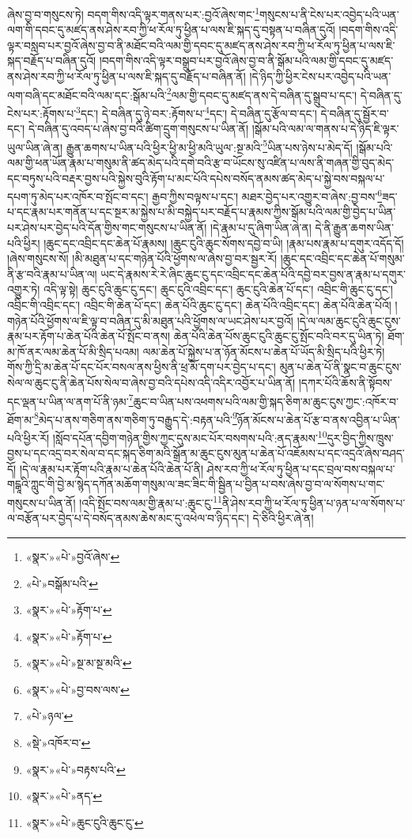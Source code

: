 ཞེས་བྱ་བ་གསུངས་ཏེ། བདག་གིས་འདི་ལྟར་གནས་པར་:བྱའོ་ཞེས་གང་\footnote{«སྣར་»«པེ་»བྱའོ་ཞེས་}གསུངས་པ་ནི་ངེས་པར་འབྱེད་པའི་ཡན་ལག་གི་དབང་དུ་མཛད་ནས་ཤེས་རབ་ཀྱི་ཕ་རོལ་ཏུ་ཕྱིན་པ་ལས་ཇི་སྐད་དུ་བསྟན་པ་བཞིན་དུའོ། །བདག་གིས་འདི་ལྟར་བསླབ་པར་བྱའོ་ཞེས་བྱ་བ་ནི་མཐོང་བའི་ལམ་གྱི་དབང་དུ་མཛད་ནས་ཤེས་རབ་ཀྱི་ཕ་རོལ་ཏུ་ཕྱིན་པ་ལས་ཇི་སྐད་བརྗོད་པ་བཞིན་དུའོ། །བདག་གིས་འདི་ལྟར་བསྒྲུབ་པར་བྱའོ་ཞེས་བྱ་བ་ནི་སྒོམ་པའི་ལམ་གྱི་དབང་དུ་མཛད་ནས་ཤེས་རབ་ཀྱི་ཕ་རོལ་ཏུ་ཕྱིན་པ་ལས་ཇི་སྐད་དུ་བརྗོད་པ་བཞིན་ནོ། །དེ་ཉིད་ཀྱི་ཕྱིར་ངེས་པར་འབྱེད་པའི་ཡན་ལག་བཞི་དང་མཐོང་བའི་ལམ་དང་:སྒོམ་པའི་\footnote{«པེ་»བསྒོམ་པའི་}ལམ་གྱི་དབང་དུ་མཛད་ནས་དེ་བཞིན་དུ་སྒྲུབ་པ་དང་། དེ་བཞིན་དུ་ངེས་པར་:རྟོགས་པ་\footnote{«སྣར་»«པེ་»རྟོག་པ་}དང་། དེ་བཞིན་དུ་ཉེ་བར་:རྟོགས་པ་\footnote{«སྣར་»«པེ་»རྟོག་པ་}དང་། དེ་བཞིན་དུ་རྩོལ་བ་དང་། དེ་བཞིན་དུ་སྦྱོར་བ་དང་། དེ་བཞིན་དུ་འབད་པ་ཞེས་བྱ་བའི་ཚིག་དྲུག་གསུངས་པ་ཡིན་ནོ། །སྒོམ་པའི་ལམ་ལ་གནས་པ་དེ་ཉིད་ཇི་ལྟར་ཡུལ་ཡིན་ཞེ་ན། རྒྱུན་ཆགས་པ་ཡིན་པའི་ཕྱིར་ཕྱི་མ་ཕྱི་མའི་ཡུལ་:སྔ་མའི་\footnote{«སྣར་»«པེ་»སྔ་མ་སྔ་མའི་}ཡིན་པས་ཉེས་པ་མེད་དོ། །སྒོམ་པའི་ལམ་གྱི་ཕན་ཡོན་རྣམ་པ་གསུམ་ནི་ཚད་མེད་པའི་དགེ་བའི་རྩ་བ་ཡོངས་སུ་འཛིན་པ་ལས་ནི་གཞན་གྱི་བུད་མེད་དང་བཏུས་པའི་བརྡར་བྱས་པའི་སྐྱེས་བུའི་རྟོག་པ་མང་པོའི་དཔེས་བསོད་ནམས་ཚད་མེད་པ་སྐྱེ་བས་བསྐལ་པ་དཔག་ཏུ་མེད་པར་འཁོར་བ་སྤོང་བ་དང་། རྒྱབ་ཀྱིས་བལྟས་པ་དང་། མཐར་བྱེད་པར་འགྱུར་བ་ཞེས་:བྱ་བས་\footnote{«སྣར་»«པེ་»བྱ་བས་ལས་}ཟད་པ་དང་རྣམ་པར་གནོན་པ་དང་སྔར་མ་སྐྱེས་པ་མི་བསྐྱེད་པར་བརྗོད་པ་རྣམས་ཀྱིས་སྒོམ་པའི་ལམ་གྱི་བྱེད་པ་ཡིན་པར་ཤེས་པར་བྱེད་པའི་དོན་གྱིས་གང་གསུངས་པ་ཡིན་ནོ། །དེ་རྣམ་པ་དུ་ཞིག་ཡིན་ཞེ་ན། དེ་ནི་རྒྱུན་ཆགས་ཡིན་པའི་ཕྱིར། །ཆུང་དང་འབྲིང་དང་ཆེན་པོ་རྣམས། །ཆུང་ངུའི་ཆུང་སོགས་དབྱེ་བ་ཡི། །རྣམ་པས་རྣམ་པ་དགུར་འདོད་དོ། །ཞེས་གསུངས་སོ། །མི་མཐུན་པ་དང་གཉེན་པོའི་ཕྱོགས་ལ་ཞེས་བྱ་བར་སྦྱར་རོ། །ཆུང་དང་འབྲིང་དང་ཆེན་པོ་གསུམ་ནི་རྩ་བའི་རྣམ་པ་ཡིན་ལ། ཡང་དེ་རྣམས་རེ་རེ་ཞིང་ཆུང་ངུ་དང་འབྲིང་དང་ཆེན་པོའི་དབྱེ་བར་བྱས་ན་རྣམ་པ་དགུར་འགྱུར་ཏེ། འདི་ལྟ་སྟེ། ཆུང་ངུའི་ཆུང་ངུ་དང་། ཆུང་ངུའི་འབྲིང་དང་། ཆུང་ངུའི་ཆེན་པོ་དང་། འབྲིང་གི་ཆུང་ངུ་དང་། འབྲིང་གི་འབྲིང་དང་། འབྲིང་གི་ཆེན་པོ་དང་། ཆེན་པོའི་ཆུང་ངུ་དང་། ཆེན་པོའི་འབྲིང་དང་། ཆེན་པོའི་ཆེན་པོའོ། །གཉེན་པོའི་ཕྱོགས་ལ་ཇི་ལྟ་བ་བཞིན་དུ་མི་མཐུན་པའི་ཕྱོགས་ལ་ཡང་ཤེས་པར་བྱའོ། །དེ་ལ་ལམ་ཆུང་ངུའི་ཆུང་ངུས་རྣམ་པར་རྟོག་པ་ཆེན་པོའི་ཆེན་པོ་སྤོང་བ་ནས། ཆེན་པོའི་ཆེན་པོས་ཆུང་ངུའི་ཆུང་ངུ་སྤོང་བའི་བར་དུ་ཡིན་ཏེ། ཐོག་མ་ཁོ་ནར་ལམ་ཆེན་པོ་མི་སྲིད་པའམ། ལམ་ཆེན་པོ་སྐྱེས་པ་ན་ཉོན་མོངས་པ་ཆེན་པོ་ཡོད་མི་སྲིད་པའི་ཕྱིར་ཏེ། གོས་ཀྱི་དྲི་མ་ཆེན་པོ་དང་པོར་བསལ་ནས་ཕྱིས་ནི་ཕྲ་མོ་དག་པར་བྱེད་པ་དང་། མུན་པ་ཆེན་པོ་ནི་སྣང་བ་ཆུང་ངུས་སེལ་ལ་ཆུང་ངུ་ནི་ཆེན་པོས་སེལ་བ་ཞེས་བྱ་བའི་དཔེས་འདི་འདིར་འབྱོར་པ་ཡིན་ནོ། །དཀར་པོའི་ཆོས་ནི་སྟོབས་དང་ལྡན་པ་ཡིན་ལ་ནག་པོ་ནི་ཉམ་\footnote{«པེ་»ཉལ་}ཆུང་བ་ཡིན་པས་འཕགས་པའི་ལམ་གྱི་སྐད་ཅིག་མ་ཆུང་ངུས་ཀྱང་:འཁོར་བ་ཐོག་མ་\footnote{«སྡེ་»འཁོར་བ་}མེད་པ་ནས་གཅིག་ནས་གཅིག་ཏུ་བརྒྱུད་དེ་:བརྟན་པའི་\footnote{«སྣར་»«པེ་»བརྟས་པའི་}ཉོན་མོངས་པ་ཆེན་པོ་རྩ་བ་ནས་འབྱིན་པ་ཡིན་པའི་ཕྱིར་རོ། །སློབ་དཔོན་དབྱིག་གཉེན་གྱིས་ཀྱང་དུས་མང་པོར་བསགས་པའི་:ནད་རྣམས་\footnote{«སྣར་»«པེ་»ནད་}དུར་བྱིད་ཀྱིས་ཁྲུས་བྱས་པ་དང་འདྲ་བར་སེལ་བ་དང་སྐད་ཅིག་མའི་སྒྲོན་མ་ཆུང་ངུས་མུན་པ་ཆེན་པོ་འཇོམས་པ་དང་འདྲའོ་ཞེས་བཤད་དོ། །དེ་ལ་རྣམ་པར་རྟོག་པའི་རྣམ་པ་ཆེན་པོའི་ཆེན་པོ་ནི། ཤེས་རབ་ཀྱི་ཕ་རོལ་ཏུ་ཕྱིན་པ་དང་བྲལ་བས་བསྐལ་པ་གངྒཱའི་ཀླུང་གི་བྱེ་མ་སྙེད་དཀོན་མཆོག་གསུམ་ལ་ཟང་ཟིང་གི་སྦྱིན་པ་བྱིན་པ་བས་ཞེས་བྱ་བ་ལ་སོགས་པ་གང་གསུངས་པ་ཡིན་ནོ། །འདི་སྤོང་བས་ལམ་གྱི་རྣམ་པ་:ཆུང་ངུ་\footnote{«སྣར་»«པེ་»ཆུང་ངུའི་ཆུང་ངུ་}ནི་ཤེས་རབ་ཀྱི་ཕ་རོལ་ཏུ་ཕྱིན་པ་ཉན་པ་ལ་སོགས་པ་ལ་བརྩོན་པར་བྱེད་པ་དེ་བསོད་ནམས་ཆེས་མང་དུ་འཕེལ་བ་ཉིད་དང་། དེ་ཅིའི་ཕྱིར་ཞེ་ན། 
